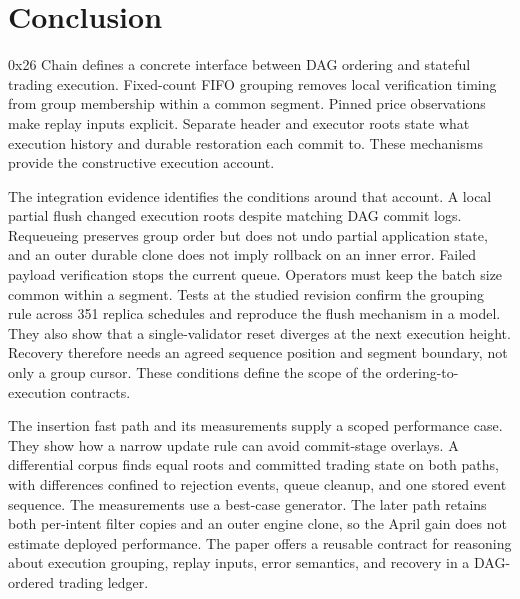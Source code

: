 \documentclass[11pt]{article}
\begin{document}
\section{Conclusion}
0x26 Chain defines a concrete interface between DAG ordering and stateful trading execution. Fixed-count FIFO grouping removes local verification timing from group membership within a common segment. Pinned price observations make replay inputs explicit. Separate header and executor roots state what execution history and durable restoration each commit to. These mechanisms provide the constructive execution account.

The integration evidence identifies the conditions around that account. A local partial flush changed execution roots despite matching DAG commit logs. Requeueing preserves group order but does not undo partial application state, and an outer durable clone does not imply rollback on an inner error. Failed payload verification stops the current queue. Operators must keep the batch size common within a segment. Tests at the studied revision confirm the grouping rule across 351 replica schedules and reproduce the flush mechanism in a model. They also show that a single-validator reset diverges at the next execution height. Recovery therefore needs an agreed sequence position and segment boundary, not only a group cursor. These conditions define the scope of the ordering-to-execution contracts.

The insertion fast path and its measurements supply a scoped performance case. They show how a narrow update rule can avoid commit-stage overlays. A differential corpus finds equal roots and committed trading state on both paths, with differences confined to rejection events, queue cleanup, and one stored event sequence. The measurements use a best-case generator. The later path retains both per-intent filter copies and an outer engine clone, so the April gain does not estimate deployed performance. The paper offers a reusable contract for reasoning about execution grouping, replay inputs, error semantics, and recovery in a DAG-ordered trading ledger.
\end{document}
